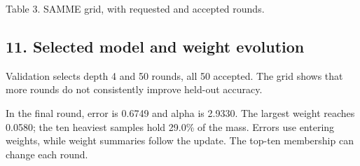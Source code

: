 \documentclass[10pt,twocolumn,letterpaper]{article}
\begin{document}
{\centering
{}
\ifdim\wd\reporttablebox>\columnwidth
\resizebox{\columnwidth}{!}{\usebox{\reporttablebox}}
\else\usebox{\reporttablebox}\fi
\par\small Table 3. SAMME grid, with requested and accepted rounds.
\par}
\vspace{4pt}
\subsection*{11. Selected model and weight evolution}
Validation selects depth 4 and 50 rounds, all 50 accepted. The grid shows that more rounds do not consistently improve held-out accuracy.

In the final round, error is 0.6749 and alpha is 2.9330. The largest weight reaches 0.0580; the ten heaviest samples hold 29.0\% of the mass. Errors use entering weights, while weight summaries follow the update. The top-ten membership can change each round.
\end{document}
